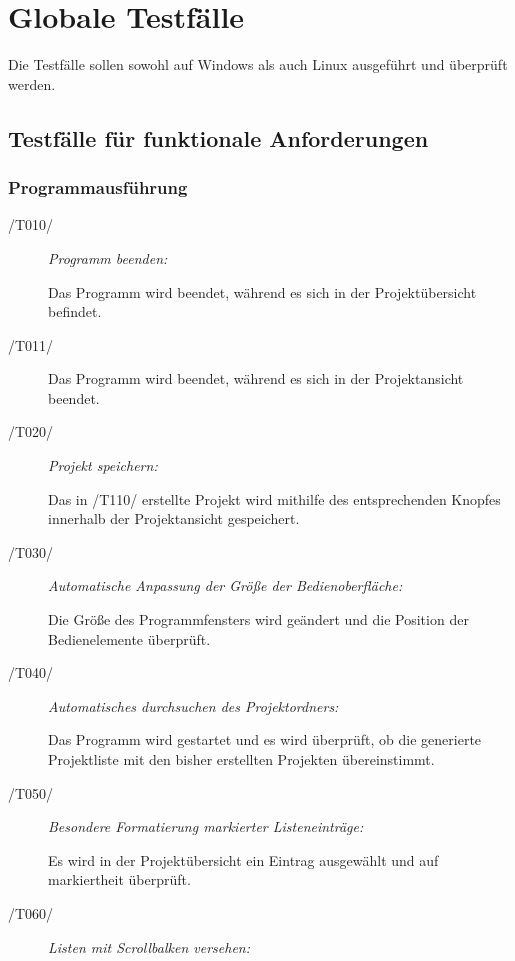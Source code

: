 \section{Globale Testfälle}

Die Testfälle sollen sowohl auf Windows als auch Linux ausgeführt und überprüft werden.


\subsection{Testfälle für funktionale Anforderungen}
	
	\subsubsection{Programmausführung}
	
		\begin{description}

			\item[/T010/] \textit{Programm beenden:}\par Das Programm wird beendet, während es sich in der Projektübersicht befindet.
			
			\item[/T011/] Das Programm wird beendet, während es sich in der Projektansicht beendet.
				
			\item[/T020/] \textit{Projekt speichern:}\par Das in /T110/ erstellte Projekt wird mithilfe des entsprechenden Knopfes innerhalb der Projektansicht gespeichert. 
				
			\item[/T030/] \textit{Automatische Anpassung der Größe der Bedienoberfläche:}\par Die Größe des Programmfensters wird geändert und die Position der Bedienelemente überprüft.
			
			\item[/T040/] \textit{Automatisches durchsuchen des Projektordners:}\par Das Programm wird gestartet und es wird überprüft, ob die generierte Projektliste mit den bisher erstellten Projekten übereinstimmt.
		
			\item[/T050/] \textit{Besondere Formatierung markierter Listeneinträge:}\par Es wird in der Projektübersicht ein Eintrag ausgewählt und auf markiertheit überprüft.
			
			\item[/T060/] \textit{Listen mit Scrollbalken versehen:}\par
			
		\end{description}

